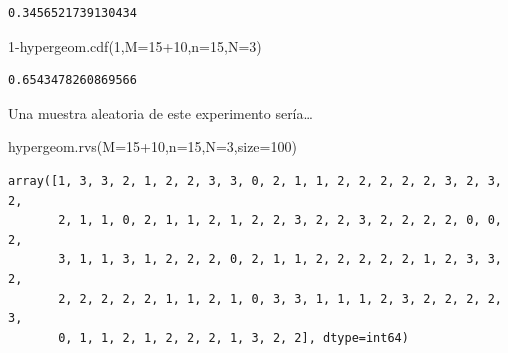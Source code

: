 \documentclass[
  letterpaper,
  DIV=11,
  numbers=noendperiod]{scrreprt}
\newenvironment{Shaded}{\begin{snugshade}}{\end{snugshade}}
\newcommand{\DecValTok}[1]{\textcolor[rgb]{0.68,0.00,0.00}{#1}}
\newcommand{\NormalTok}[1]{\textcolor[rgb]{0.00,0.23,0.31}{#1}}
\newcommand{\OperatorTok}[1]{\textcolor[rgb]{0.37,0.37,0.37}{#1}}
\begin{document}
\begin{verbatim}
0.3456521739130434
\end{verbatim}

\begin{Shaded}
\begin{Highlighting}[]
\DecValTok{1}\OperatorTok{{-}}\NormalTok{hypergeom.cdf(}\DecValTok{1}\NormalTok{,M}\OperatorTok{=}\DecValTok{15}\OperatorTok{+}\DecValTok{10}\NormalTok{,n}\OperatorTok{=}\DecValTok{15}\NormalTok{,N}\OperatorTok{=}\DecValTok{3}\NormalTok{)}
\end{Highlighting}
\end{Shaded}

\begin{verbatim}
0.6543478260869566
\end{verbatim}

Una muestra aleatoria de este experimento sería\ldots{}

\begin{Shaded}
\begin{Highlighting}[]
\NormalTok{hypergeom.rvs(M}\OperatorTok{=}\DecValTok{15}\OperatorTok{+}\DecValTok{10}\NormalTok{,n}\OperatorTok{=}\DecValTok{15}\NormalTok{,N}\OperatorTok{=}\DecValTok{3}\NormalTok{,size}\OperatorTok{=}\DecValTok{100}\NormalTok{)}
\end{Highlighting}
\end{Shaded}

\begin{verbatim}
array([1, 3, 3, 2, 1, 2, 2, 3, 3, 0, 2, 1, 1, 2, 2, 2, 2, 2, 3, 2, 3, 2,
       2, 1, 1, 0, 2, 1, 1, 2, 1, 2, 2, 3, 2, 2, 3, 2, 2, 2, 2, 0, 0, 2,
       3, 1, 1, 3, 1, 2, 2, 2, 0, 2, 1, 1, 2, 2, 2, 2, 2, 1, 2, 3, 3, 2,
       2, 2, 2, 2, 2, 1, 1, 2, 1, 0, 3, 3, 1, 1, 1, 2, 3, 2, 2, 2, 2, 3,
       0, 1, 1, 2, 1, 2, 2, 2, 1, 3, 2, 2], dtype=int64)
\end{verbatim}
\end{document}

